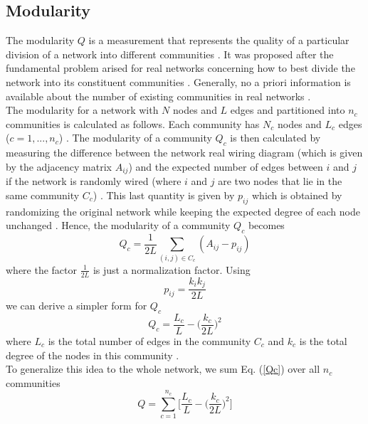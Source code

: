 \documentclass[11 pt , letterpaper , twoside , openright]{book}
\begin{document}
\subsection{Modularity}

The modularity $Q$ is a measurement that represents the quality of a particular division of a network into different communities \cite{F.Costa2007}. It was proposed after the fundamental problem arised for real networks concerning how to best divide the network into its constituent communities \cite{F.Costa2007}. Generally, no a priori information is available about the number of existing communities in real networks \cite{F.Costa2007}.\\
The modularity for a network with $N$ nodes and $L$ edges and partitioned into $n_c$ communities is calculated as follows. Each community has $N_c$ nodes and $L_c$ edges ($c = 1,..., n_c$) \cite{Albert2016}. The modularity of a community $Q_c$ is then calculated by measuring the difference between the network real wiring diagram (which is given by the adjacency matrix $A_{ij}$) and the expected number of edges between $i$ and $j$ if the network is randomly wired (where $i$ and $j$ are two nodes that lie in the same community $C_c$) \cite{Albert2016}. This last quantity is given by $p_{ij}$ which is obtained by randomizing the original network while keeping the expected degree of each node unchanged \cite{Albert2016}. Hence, the modularity of a community $Q_c$ becomes \cite{Albert2016}
\begin{equation}
	Q_c = \frac{1}{2L}\sum_{(i,j) \in C_c} (A_{ij} - p_{ij})
\end{equation}
where the factor $\frac{1}{2L}$ is just a normalization factor. Using \cite{Albert2016}
\begin{equation}
	p_{ij} = \frac{k_ik_j}{2L}
\end{equation}
we can derive a simpler form for $Q_c$ \cite{Albert2016}
\begin{equation}\label{Qc}
	Q_c = \frac{L_c}{L} - \bigg(\frac{k_c}{2L}\bigg)^2
\end{equation}
where $L_c$ is the total number of edges in the community $C_c$ and $k_c$ is the total degree of the nodes in this community \cite{Albert2016}.\\
To generalize this idea to the whole network, we sum Eq. (\ref{Qc}) over all $n_c$ communities \cite{Albert2016}
\begin{equation}\label{mod}
	Q = \sum_{c = 1}^{n_c}\bigg[\frac{L_c}{L} - \bigg(\frac{k_c}{2L}\bigg)^2 \bigg]
\end{equation}
\end{document}
